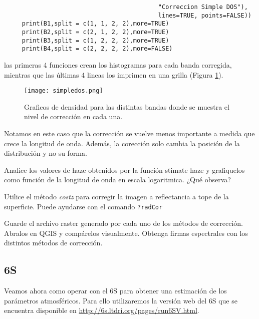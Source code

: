 \begin{exa}
\begin{lstlisting}
                                           "Correccion Simple DOS"),
                                           lines=TRUE, points=FALSE))
     print(B1,split = c(1, 1, 2, 2),more=TRUE)
     print(B2,split = c(2, 1, 2, 2),more=TRUE)
     print(B3,split = c(1, 2, 2, 2),more=TRUE)
     print(B4,split = c(2, 2, 2, 2),more=FALSE)
    \end{lstlisting}
    las primeras 4 funciones crean los histogramas para cada banda
    corregida, mientras que las \'ultimas 4 lineas los imprimen en una grilla (Figura \ref{fig:simpledos}).
    \begin{figure}[h!]
    \begin{center}
        \texttt{[image: simpledos.png]}
    \end{center}
    \caption{Graficos de densidad para las distintas bandas donde se
        muestra el nivel de correcci\'on en cada una.}
    \label{fig:simpledos}
    \end{figure}
Notamos en este caso que la correcci\'on se vuelve menos importante a medida
que crece la longitud de onda. Adem\'as, la corecci\'on solo cambia la
posici\'on de la distribuci\'on y no su forma.

\end{exa}
\begin{act}
    Analice los valores de haze obtenidos por la funci\'on stimate haze y grafiquelos
    como funci\'on de la longitud de onda en escala logaritmica. ¿Qu\'e observa?
\end{act}

\begin{act}
    Utilice el m\'etodo \emph{costz} para corregir la imagen a reflectancia a tope
    de la superficie. Puede ayudarse con el comando \texttt{?radCor}
\end{act}

\begin{act}
    Guarde el archivo raster generado por cada uno de los m\'etodos de
    correcci\'on. Abralos en QGIS y comp\'arelos visualmente. Obtenga firmas
    espectrales con los distintos m\'etodos de correcci\'on.
\end{act}


\subsection{6S}
\label{sub:corr:6S}

Veamos ahora como operar con el 6S para obtener una estimaci\'on de los par\'ametros
atmosf\'ericos. Para ello utilizaremos la versi\'on web del 6S que se encuentra
disponible en \url{http://6s.ltdri.org/pages/run6SV.html}.


